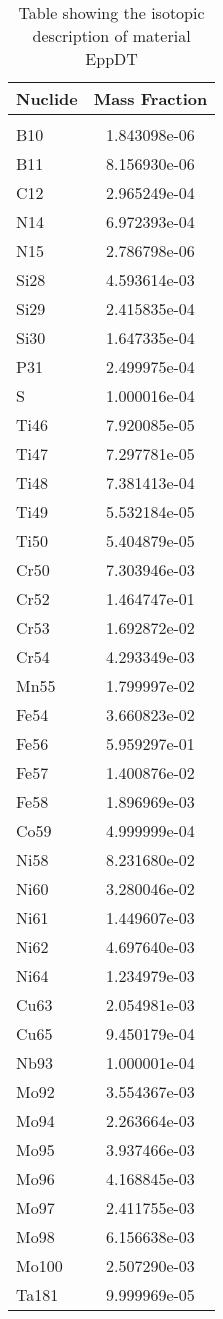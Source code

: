 \begin{centering}
\begin{table}[ht!]
\begin{tabular}{l | c}
\hline
Nuclide & Mass Fraction\\
\hline
\\
B10 & 1.843098e-06\\
B11 & 8.156930e-06\\
C12 & 2.965249e-04\\
N14 & 6.972393e-04\\
N15 & 2.786798e-06\\
Si28 & 4.593614e-03\\
Si29 & 2.415835e-04\\
Si30 & 1.647335e-04\\
P31 & 2.499975e-04\\
S & 1.000016e-04\\
Ti46 & 7.920085e-05\\
Ti47 & 7.297781e-05\\
Ti48 & 7.381413e-04\\
Ti49 & 5.532184e-05\\
Ti50 & 5.404879e-05\\
Cr50 & 7.303946e-03\\
Cr52 & 1.464747e-01\\
Cr53 & 1.692872e-02\\
Cr54 & 4.293349e-03\\
Mn55 & 1.799997e-02\\
Fe54 & 3.660823e-02\\
Fe56 & 5.959297e-01\\
Fe57 & 1.400876e-02\\
Fe58 & 1.896969e-03\\
Co59 & 4.999999e-04\\
Ni58 & 8.231680e-02\\
Ni60 & 3.280046e-02\\
Ni61 & 1.449607e-03\\
Ni62 & 4.697640e-03\\
Ni64 & 1.234979e-03\\
Cu63 & 2.054981e-03\\
Cu65 & 9.450179e-04\\
Nb93 & 1.000001e-04\\
Mo92 & 3.554367e-03\\
Mo94 & 2.263664e-03\\
Mo95 & 3.937466e-03\\
Mo96 & 4.168845e-03\\
Mo97 & 2.411755e-03\\
Mo98 & 6.156638e-03\\
Mo100 & 2.507290e-03\\
Ta181 & 9.999969e-05
\end{tabular}
\caption{Table showing the isotopic description of material EppDT}
\label{table:material_EppDT}
\end{table}\clearpage


\end{centering}
